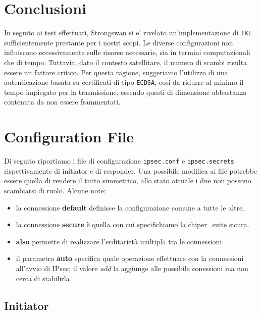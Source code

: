 \documentclass[
10pt, %
a4paper, %
oneside, %
headinclude,footinclude, %
BCOR5mm, %
]{scrartcl}
\begin{document}
\section{Conclusioni}
In seguito ai test effettuati, Strongswan si e' rivelato un'implementazione di \lstinline|IKE| sufficientemente prestante per i nostri scopi. 
Le diverse configurazioni non influiscono eccessivamente sulle risorse necessarie, sia in termini computazionali che di tempo. 
Tuttavia, dato il contesto satellitare, il numero di scambi risulta essere un fattore critico. 
Per questa ragione, suggeriamo l'utilizzo di una autenticazione basata su certificati di tipo \lstinline|ECDSA|, cosi da ridurre al minimo il tempo impiegato per la trasmissione, essendo questi di dimensione abbastanza contenuta da non essere frammentati.
\newpage
\appendix

\section{Configuration File}
\hypertarget{configuration}{}
Di seguito riportiamo i file di configurazione \lstinline|ipsec.conf| e \lstinline|ipsec.secrets| rispettivamente di 
initiator e di responder. Una possibile modifica ai file potrebbe essere quella di rendere il tutto simmetrico, allo stato 
attuale i due non possono scambiarsi di ruolo. Alcune note:

\begin{itemize}
    \item la connessione \textbf{default} definisce la configurazione comune a tutte le altre.
    \item la connessione \textbf{secure} è quella con cui specifichiamo la chiper\_suite sicura.
    \item \textbf{also} permette di realizzare l'erditarietà multipla tra le connessioni.
    \item il parametro \textbf{auto} specifica quale operazione effettuare con la connessioni all'avvio di IPsec; il valore \textit{add} la aggiunge alle possibile conessioni ma non cerca di stabilirla
\end{itemize}

\subsection{Initiator}
\end{document}
